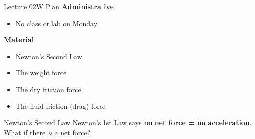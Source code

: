\documentclass[english]{beamer}
\begin{document}
\begin{frame}{Lecture 02W Plan}
  \textbf{Administrative}
  \begin{itemize}
    \item No class or lab on Monday
  \end{itemize}
  \textbf{Material}
  \begin{itemize}
    \item Newton's Second Law
    \item The weight force
    \item The dry friction force
    \item The fluid friction (drag) force
  \end{itemize}
\end{frame}

\begin{frame}{Newton's Second Law}
  Newton's 1st Law says \textbf{no net force = no acceleration}. What if there \emph{is} a net force?
\end{frame}
\end{document}
